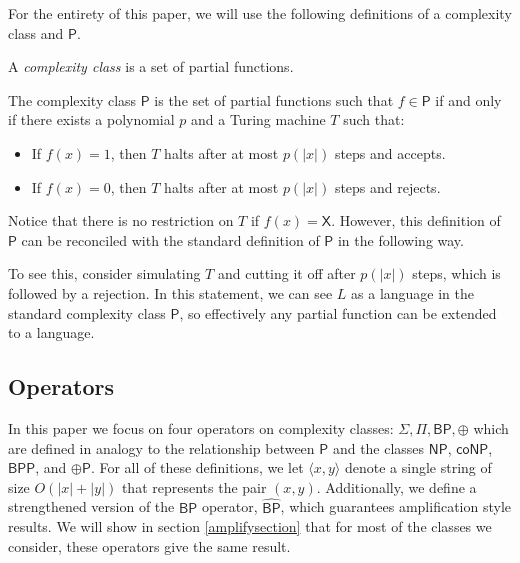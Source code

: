 \documentclass[11pt]{article}
\newcommand{\bp}{\textsf{BP}}
\newcommand{\strongbp}{\widehat{\textsf{BP}}}
\newcommand{\bpp}{\textsf{BPP}}
\newcommand{\parity}{\oplus}
\newcommand{\p}{\textsf{P}}
\newcommand{\np}{\textsf{NP}}
\newcommand{\conp}{\textsf{coNP}}
\newcommand{\x}{\textsf{X}}
\begin{document}
For the entirety of this paper, we will use the following definitions of a complexity class and $\p$.

\begin{definition}\label{complexityclass}
A \emph{complexity class} is a set of partial functions.
\end{definition}

\begin{definition}\label{p}
The complexity class $\p$ is the set of partial functions such that $f \in \p$ if and only if there exists a polynomial $p$ and a Turing machine $T$ such that:
\begin{itemize}
\item If $f(x) = 1$, then $T$ halts after at most $p(|x|)$ steps and accepts.
\item If $f(x) = 0$, then $T$ halts after at most $p(|x|)$ steps and rejects.
\end{itemize}
\end{definition}

Notice that there is no restriction on $T$ if $f(x) = \x$. However, this definition of $\p$ can be reconciled with the standard definition of $\p$ in the following way.


To see this, consider simulating $T$ and cutting it off after $p(|x|)$ steps, which is followed by a rejection. In this statement, we can see $L$ as a language in the standard complexity class $\p$, so effectively any partial function can be extended to a language.

\subsection{Operators}

In this paper we focus on four operators on complexity classes: $\Sigma, \Pi, \bp, \parity$ which are defined in analogy to the relationship between $\p$ and the classes $\np$, $\conp$, $\bpp$, and $\parity\p$. For all of these definitions, we let $\langle x, y\rangle$ denote a single string of size $O(|x| + |y|)$ that represents the pair $(x,y)$. Additionally, we define a strengthened version of the $\bp$ operator, $\strongbp$, which guarantees amplification style results. We will show in section \ref{amplifysection} that for most of the classes we consider, these operators give the same result.
\end{document}
